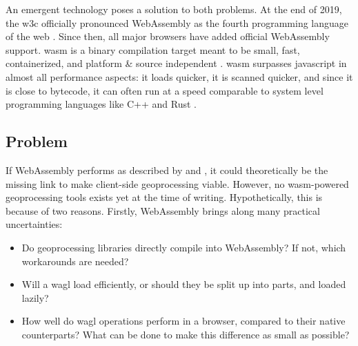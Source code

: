An emergent technology poses a solution to both problems. At the end of 2019, the \ac{w3c} officially pronounced WebAssembly as the fourth programming language of the web \cite{w3c_world_2019}. Since then, all major browsers have added official WebAssembly support. \ac{wasm} is a binary compilation target meant to be small, fast, containerized, and platform \& source independent \cite{haas_bringing_2017}. \ac{wasm} surpasses javascript in almost all performance aspects: it loads quicker, it is scanned quicker, and since it is close to bytecode, it can often run at a speed comparable to system level programming languages like C++ and Rust \cite{jangda_not_2019}. 




\newpage


\subsection{Problem}

If WebAssembly performs as described by \cite{haas_bringing_2017} and \cite{jangda_not_2019}, it could theoretically be the missing link to make client-side geoprocessing viable. However, no wasm-powered geoprocessing tools exists yet at the time of writing. Hypothetically, this is because of two reasons. Firstly, WebAssembly brings along many practical uncertainties:

\begin{itemize}
  \item Do geoprocessing libraries directly compile into WebAssembly? If not, which workarounds are needed? 
  \item Will a \ac{wagl} load efficiently, or should they be split up into parts, and loaded lazily? 
  \item How well do \ac{wagl} operations perform in a browser, compared to their native counterparts? What can be done to make this difference as small as possible?
\end{itemize}

